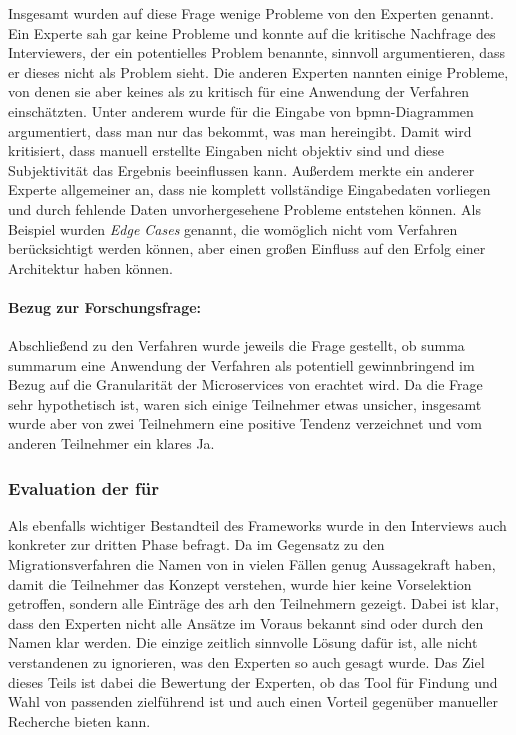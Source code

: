 Insgesamt wurden auf diese Frage wenige Probleme von den Experten genannt.
Ein Experte sah gar keine Probleme und konnte auf die kritische Nachfrage des Interviewers, der ein potentielles Problem benannte, sinnvoll argumentieren, dass er dieses nicht als Problem sieht.
Die anderen Experten nannten einige Probleme, von denen sie aber keines als zu kritisch für eine Anwendung der Verfahren einschätzten.
Unter anderem wurde für die Eingabe von \gls{bpmn}-Diagrammen argumentiert, dass man \glqq nur das bekommt, was man hereingibt\grqq{}.
Damit wird kritisiert, dass manuell erstellte Eingaben nicht objektiv sind und diese Subjektivität das Ergebnis beeinflussen kann.
Außerdem merkte ein anderer Experte allgemeiner an, dass nie komplett vollständige Eingabedaten vorliegen und durch fehlende Daten unvorhergesehene Probleme entstehen können.
Als Beispiel wurden \emph{Edge Cases} genannt, die womöglich nicht vom Verfahren berücksichtigt werden können, aber einen großen Einfluss auf den Erfolg einer Architektur haben können.

\paragraph{Bezug zur Forschungsfrage:} Abschließend zu den Verfahren wurde jeweils die Frage gestellt, ob summa summarum eine Anwendung der Verfahren als potentiell gewinnbringend im Bezug auf die Granularität der Microservices von \jf erachtet wird.
Da die Frage sehr hypothetisch ist, waren sich einige Teilnehmer etwas unsicher, insgesamt wurde aber von zwei Teilnehmern eine positive Tendenz verzeichnet und vom anderen Teilnehmer ein klares \glqq Ja\grqq{}.


\subsubsection{Evaluation der \bpp für \jf}
\label{sec:evaluation-mmf-anwendung-bp-patterns}

Als ebenfalls wichtiger Bestandteil des Frameworks wurde in den Interviews auch konkreter zur dritten Phase befragt.
Da im Gegensatz zu den Migrationsverfahren die Namen von \bpp in vielen Fällen genug Aussagekraft haben, damit die Teilnehmer das Konzept verstehen, wurde hier keine Vorselektion getroffen, sondern alle Einträge des \gls{arh} den Teilnehmern gezeigt.
Dabei ist klar, dass den Experten nicht alle Ansätze im Voraus bekannt sind oder durch den Namen klar werden.
Die einzige zeitlich sinnvolle Lösung dafür ist, alle nicht verstandenen \bpp zu ignorieren, was den Experten so auch gesagt wurde.
Das Ziel dieses Teils ist dabei die Bewertung der Experten, ob das Tool für Findung und Wahl von passenden \bpp zielführend ist und auch einen Vorteil gegenüber manueller Recherche bieten kann.

